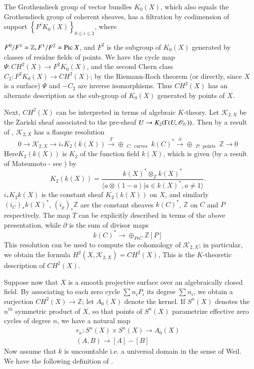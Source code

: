 The Grothendieck group of vector bundles $K_0(X)$, which also equals the Grothendieck group of coherent sheaves, has a filtration by codimension of support $\left\{F^{i}K_0(X)\right\}_{0\leq i \leq 2}$, where 

$F^{0}/F^{1}\simeq \mathbb{Z}, F^{1}/F^{2}\simeq \mathrm{Pic}\ X$, and $F^{2}$ is the subgroup of $K_0(X)$ generated by classes of residue fields of points. We have the cycle map $\Psi:CH^{2}(X)\to F^{2}K_0(X)$, and the second Chern class $C_2:F^{2}K_0(X)\to CH^{2}(X)$; by the Riemann-Roch theorem (or directly, since $X$ is a surface) $\Psi$ and $-C_2$ are inverse isomorphisms. Thus $CH^{2}(X)$ has an alternate description as the sub-group of $K_0(X)$ generated by points of $X$. 

Next, $CH^{2}(X)$ can be interpreted in terms of algebraic $K$-theory. Let $\mathscr{K}_{2,X}$ be the Zariski sheaf associated to the pre-sheaf $U\to K_2(\Gamma (U,\\\mathscr{O}_U))$. Then by a result of \cite{Quillen}, $\mathscr{K}_{2,X}$ has a flasque resolution 
$$
0\to \mathscr{K}_{2, X}\to i_{\ast}K_2(k(X))\xrightarrow{T}\oplus \displaystyle\mathop{(i_C)_{\ast}}_{C: \text{ curves }} k(C)^{\ast}\xrightarrow{\partial}\oplus \displaystyle\mathop{(i_p)_{\ast}}_{P:\text{ points }}\mathbb{Z}\to 0
$$
Here\pageoriginale $K_2(k(X))$ is $K_2$ of the function field $k(X)$, which is given (by a result of Matsumoto - see \cite{Milnor}) by 
$$
K_2(k(X))=\dfrac{k(X)^{\ast}\otimes_{\mathbb{Z}}k(X)^{\ast}}{\langle a \otimes (1-a)|a\in k (X)^{\ast}, a\neq 1\rangle}.
$$ 
$i_{\ast} K_2k(X)$ is the constant sheaf $K_2(k(X))$ on $X$, and similarly $(i_C)_{\ast} k(X)^{\ast}$, $(i_p)_{\ast}\mathbb{Z}$ are the constant sheaves $k(C)^{\ast}$, $\mathbb{Z}$ on $C$ and $P$ respectively. The map $T$ can be explicitly described in terms of the above presentation, while $\partial$ is the sum of divisor maps 
$$
k(C)^{\ast}\to \displaystyle\mathop{\oplus}_{P \epsilon C} \mathbb{Z}[P]
$$
This resolution can be used to compute the cohomology of $\mathscr{K}_{2, X}$; in particular, we obtain the formula $H^{2}(X, \mathscr{K}_{2, X})=CH^{2}(X)$, This is the $K$-theoretic description of $CH^{2}(X)$. 

Suppose now that $X$ is a smooth projective surface over an algebraically closed field. By associating to each zero cycle $\sum n_i P_i$ its degree $\sum n_i$, we obtain a surjection $CH^{2}(X)\to \mathbb{Z}$; let $A_0(X)$ denote the kernel. If $S^{n}(X)$ denotes the $n^{th}$ symmetric product of $X$, so that points of $S^{n}(X)$ parametrize effective zero cycles of degree $n$, we have a natural map 
\begin{gather*}
r_n:S^{n}(X)\times S^{n}(X)\to A_0(X)\\
(A,B)\to [A] - [B]
\end{gather*}
Now assume that $k$ is uncountable i.e. a universal domain in the sense of Weil. We have the following definition of \cite{Mumford}.

